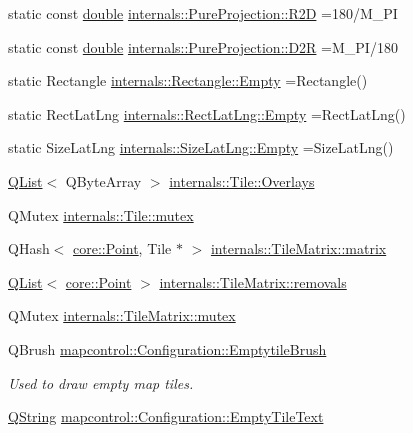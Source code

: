 \begin{DoxyCompactItemize}
static const \hyperlink{_super_l_u_support_8h_a8956b2b9f49bf918deed98379d159ca7}{double} \hyperlink{group___o_p_map_widget_ga112e42b7b86260ce042d7c14b4ece2b7}{internals\-::\-Pure\-Projection\-::\-R2\-D} =180/M\-\_\-\-P\-I
\item 
static const \hyperlink{_super_l_u_support_8h_a8956b2b9f49bf918deed98379d159ca7}{double} \hyperlink{group___o_p_map_widget_ga52ec5ac7446a549728bf6e9c798ed6f6}{internals\-::\-Pure\-Projection\-::\-D2\-R} =M\-\_\-\-P\-I/180
\item 
static Rectangle \hyperlink{group___o_p_map_widget_ga747b738c524d1f0bb7b4a00e9de42da4}{internals\-::\-Rectangle\-::\-Empty} =Rectangle()
\item 
static Rect\-Lat\-Lng \hyperlink{group___o_p_map_widget_ga0975dcf29ee445b5510f2c502940b50a}{internals\-::\-Rect\-Lat\-Lng\-::\-Empty} =Rect\-Lat\-Lng()
\item 
static Size\-Lat\-Lng \hyperlink{group___o_p_map_widget_gad305f7cf650e7a5490bb77ccc65bbe08}{internals\-::\-Size\-Lat\-Lng\-::\-Empty} =Size\-Lat\-Lng()
\item 
\hyperlink{class_q_list}{Q\-List}$<$ Q\-Byte\-Array $>$ \hyperlink{group___o_p_map_widget_ga45369aa8480e3bd7ff5c6a6017573361}{internals\-::\-Tile\-::\-Overlays}
\item 
Q\-Mutex \hyperlink{group___o_p_map_widget_gadfb1115a74bee691ed9d70c97b727ef7}{internals\-::\-Tile\-::mutex}
\item 
Q\-Hash$<$ \hyperlink{structcore_1_1_point}{core\-::\-Point}, Tile $\ast$ $>$ \hyperlink{group___o_p_map_widget_gaecc6fdfe28242560867ab83c02820b20}{internals\-::\-Tile\-Matrix\-::matrix}
\item 
\hyperlink{class_q_list}{Q\-List}$<$ \hyperlink{structcore_1_1_point}{core\-::\-Point} $>$ \hyperlink{group___o_p_map_widget_gaba9b5e3cf2e51b2a87c5a343968573e9}{internals\-::\-Tile\-Matrix\-::removals}
\item 
Q\-Mutex \hyperlink{group___o_p_map_widget_gae5c51dfc2c2d290c958e335bef18f0a1}{internals\-::\-Tile\-Matrix\-::mutex}
\item 
Q\-Brush \hyperlink{group___o_p_map_widget_gad6bf957803f87dacf49bbff6998c72b6}{mapcontrol\-::\-Configuration\-::\-Emptytile\-Brush}
\begin{DoxyCompactList}\small\item\em Used to draw empty map tiles. \end{DoxyCompactList}\item 
\hyperlink{group___u_a_v_objects_plugin_gab9d252f49c333c94a72f97ce3105a32d}{Q\-String} \hyperlink{group___o_p_map_widget_ga3cee2f55adac9ad6424d5ea36a1fec54}{mapcontrol\-::\-Configuration\-::\-Empty\-Tile\-Text}

\end{DoxyCompactItemize}
